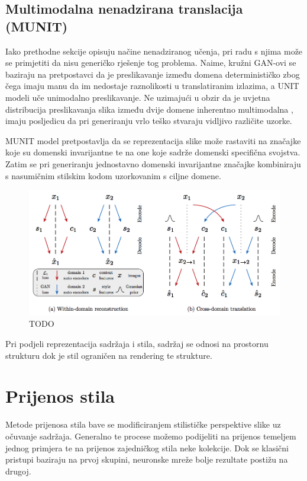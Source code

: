 \documentclass[lmodern, utf8, seminar]{fer}
\begin{document}
\newpage
\section{Multimodalna nenadzirana translacija (MUNIT)}
Iako prethodne sekcije opisuju načine nenadziranog učenja, pri radu s njima može se primjetiti da nisu generičko rješenje tog problema. Naime, kružni GAN-ovi se baziraju na pretpostavci da je preslikavanje između domena determinističko zbog čega imaju manu da im nedostaje raznolikosti u translatiranim izlazima, a UNIT modeli uče unimodalno preslikavanje. Ne uzimajući u obzir da je uvjetna distribucija preslikavanja slika između dvije domene inherentno multimodalna \cite{huang2018multimodal}, imaju posljedicu  da pri generiranju vrlo teško stvaraju vidljivo različite uzorke. 

MUNIT model pretpostavlja da se reprezentacija slike može rastaviti na značajke koje su domenski invarijantne te na one koje sadrže domenski specifična svojstva. Zatim se pri generiranju jednostavno domenski invarijantne značajke kombiniraju s nasumičnim stilskim kodom uzorkovanim s ciljne domene.
\newline

\begin{figure}[H]
    \centering
    \includegraphics[width=1\textwidth]{huang2018multimodal-munit}
    \caption{ TODO }
    \label{fig:huang2018multimodal-munit}
\end{figure}


Pri podjeli reprezentacija sadržaja i stila, sadržaj se odnosi na prostornu strukturu dok je stil ograničen na rendering te strukture.




\chapter{Prijenos stila}
Metode prijenosa stila bave se modificiranjem stilističke perspektive slike uz očuvanje sadržaja. Generalno te procese možemo podijeliti na prijenos temeljem jednog primjera te na prijenos zajedničkog stila neke kolekcije. Dok se klasični pristupi baziraju na prvoj skupini, neuronske mreže bolje rezultate postižu na drugoj. 
\end{document}
